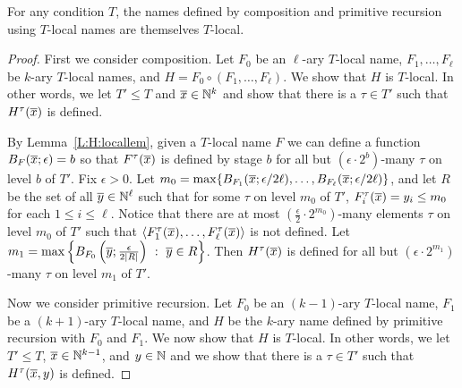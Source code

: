 \begin{prop}[$\RCAo$]\label{P:R:comp&pr}
For any condition $T$,
the names defined by composition and primitive recursion
using $T$-local names are themselves $T$-local.
\end{prop}
\begin{proof}
First we consider composition.
Let $F_0$ be an $\ell$-ary $T$-local name, $F_1,\ldots,F_\ell$ be $k$-ary $T$-local names,
and $H=F_0\circ(F_1,\ldots,F_\ell)$.
We show that $H$ is $T$-local.
In other words, we let $T'\leq T$ and $\overline{x}\in\mathbb{N}^k$
and show that there is a $\tau\in T'$ such that $H^\tau(\overline{x})$ is defined.

By Lemma~\ref{L:H:locallem}, given a $T$-local name $F$ we can define a function
$B_F(\overline{x};\epsilon)=b$ so that $F^\tau(\overline{x})$ is defined by stage $b$ for all
but $(\epsilon\cdot 2^b)$-many $\tau$ on level $b$ of $T'$.
Fix $\epsilon>0$.
Let $m_0=\max\{B_{F_1}(\overline{x};\epsilon/2\ell),\ldots,B_{F_\ell}(\overline{x};\epsilon/2\ell)\}$, and
let $R$ be the set of all $\overline{y}\in\mathbb{N}^\ell$ such that
for some $\tau$ on level $m_0$ of $T'$, $F_i^\tau(\overline{x})=y_i\leq m_0$ for each $1\leq i\leq \ell$.
Notice that there are at most $(\frac{\epsilon}{2}\cdot 2^{m_0})$-many elements $\tau$ on level
$m_0$ of $T'$ such that $\left\langle F_1^\tau(\overline{x}),\ldots,F_\ell^\tau(\overline{x})\right\rangle$ is not defined.
Let $m_1=\max\left\{B_{F_0}\left(\overline{y};\frac{\epsilon}{2|R|}\right)\ :\ \overline{y}\in R\right\}$.
Then $H^\tau(\overline{x})$ is defined for all
but $(\epsilon\cdot 2^{m_1})$-many $\tau$ on level $m_1$ of $T'$.

Now we consider primitive recursion.
Let $F_0$ be an $(k-1)$-ary $T$-local name, $F_1$ be a $(k+1)$-ary $T$-local name,
and $H$ be the $k$-ary name defined by primitive recursion with $F_0$ and $F_1$.
We now show that $H$ is $T$-local.
In other words, we let $T'\leq T$, $\overline{x}\in\mathbb{N}^{k-1}$, and $y\in\mathbb{N}$
and we show that there is a $\tau\in T'$ such that $H^\tau(\overline{x},y)$ is defined.


\end{proof}
